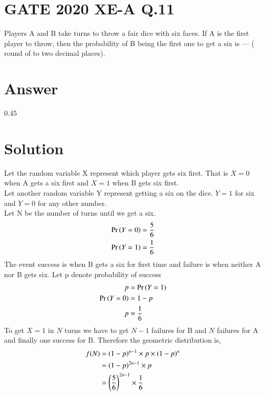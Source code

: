 \documentclass[journal,12pt,twocolumn]{IEEEtran}
\begin{document}
\section{GATE 2020 XE-A Q.11}
Players A and B take turns to throw a fair dice with six faces. If A is the first player to throw, then the probability of B being the first one to get a six is --- ( round of to two decimal places). \\

\section{Answer}
0.45
\section{Solution}
Let the random variable X represent which player gets six first. That is $X=0 $ when A gets a six first and $X=1 $ when B gets six first. \\
Let another random variable Y represent getting a six on the dice. $Y=1 $ for six and $Y=0 $ for any other number. \\
Let N be the number of turns until we get a six.
\begin{align}
    \Pr\left(Y=0\right) = \frac{5}{6} \\
    \Pr\left(Y=1\right) = \frac{1}{6}
\end{align}
The event success is when B gets a six for first time and failure is when neither A nor B gets six. Let p denote probability of success 
\begin{align}
    p &= \Pr\left(Y=1\right)  \\
    \Pr\left(Y=0\right) &= 1- p \\
    p &= \frac{1}{6}
\end{align}
To get $X=1 $ in $N$ turns we have to get $N-1$ failures for B and $ N$ failures for A and finally one success for B. 
Therefore the geometric distribution is,
\begin{align}
    f(N) &= \left(1-p\right)^{n-1} \times p \times  \left(1-p\right)^{n} \\
    &  = \left(1-p\right)^{2n-1} \times p \\
    & = \left( \frac{5}{6}\right)^{2n-1} \times \frac{1}{6}
\end{align}
\end{document}
